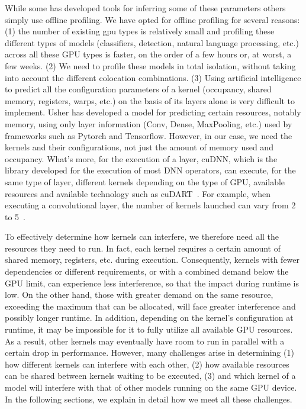 While some has developed tools for inferring some of these parameters others
simply use offline profiling. We have opted for offline profiling for several
reasons: (1) the number of existing gpu types is relatively small and profiling
these different types of models (classifiers, detection, natural language
processing, etc.) across all these GPU types is faster, on the order of a few
hours or, at worst, a few weeks. (2) We need to profile these models in total
isolation, without taking into account the different colocation combinations.
(3) Using artificial intelligence to predict all the configuration parameters of
a kernel (occupancy, shared memory, registers, warps, etc.) on the basis of its
layers alone is very difficult to implement. Usher has developed a model for
predicting certain resources, notably memory, using only layer information
(Conv, Dense, MaxPooling, etc.) used by frameworks such as Pytorch and
Tensorflow. However, in our case, we need the kernels and their configurations,
not just the amount of memory used and occupancy. What's more, for the execution
of a layer, cuDNN, which is the library developed for the execution of most DNN
operators, can execute, for the same type of layer, different kernels depending
on the type of GPU, available resources and available technology such as
cuDART~. For example, when executing a convolutional layer,
the number of kernels launched can vary from 2 to 5~.


To effectively determine how kernels can interfere, we therefore need all the resources they need to run. In fact, each kernel requires a certain amount of shared memory, registers, etc. during execution. Consequently, kernels with fewer dependencies or different requirements, or with a combined demand below the GPU limit, can experience less interference, so that the impact during runtime is low. On the other hand, those with greater demand on the same resource, exceeding the maximum that can be allocated, will face greater interference and possibly longer runtime. In addition, depending on the kernel's configuration at runtime, it may be impossible for it to fully utilize all available GPU resources. As a result, other kernels may eventually have room to run in parallel with a certain drop in performance. However, many challenges arise in determining (1) how different kernels can interfere with each other, (2) how available resources can be shared between kernels waiting to be executed, (3) and which kernel of a model will interfere with that of other models running on the same GPU device. In the following sections, we explain in detail how we meet all these challenges.